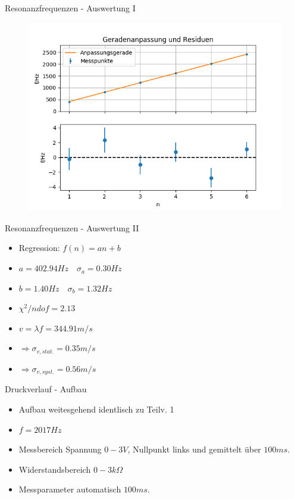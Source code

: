 \documentclass[14pt]{beamer}
\begin{document}
\begin{frame}{Resonanzfrequenzen - Auswertung I}
\begin{figure}
\includegraphics[width=\linewidth , height=0.75\textheight]{fitplot}
\end{figure}
\end{frame}

\begin{frame}{Resonanzfrequenzen - Auswertung II}
\begin{itemize}
\item Regression: $f(n)=a n+b$
\item $a=402.94Hz \quad \sigma_a=0.30Hz$
\item $b=1.40Hz \quad \sigma_b=1.32Hz$
\item $\chi^2/ndof=2.13$
\item $v=\lambda f = 344.91m/s$
\item $\Rightarrow \sigma_{v,stat.}=0.35m/s$
\item $\Rightarrow \sigma_{v,syst.}=0.56m/s$
\end{itemize}
\end{frame}

\begin{frame}{Druckverlauf - Aufbau}
\begin{itemize}
\item Aufbau weitesgehend identlisch zu Teilv. 1
\item $f=2017Hz$
\item Messbereich Spannung $0-3V$, Nullpunkt links und gemittelt über $100ms$.
\item Widerstandsbereich $0-3k \Omega$
\item Messparameter automatisch $100ms$.
\end{itemize}

\end{frame}
\end{document}

